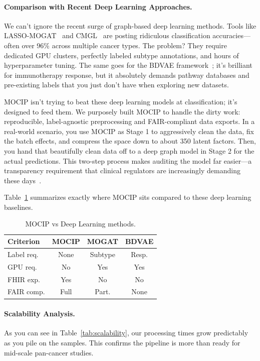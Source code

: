 \documentclass[conference,flushend]{iaria} %
\begin{document}
\paragraph{Comparison with Recent Deep Learning Approaches.}
We can't ignore the recent surge of graph-based deep learning methods. Tools like LASSO-MOGAT~\cite{alharbi2024lassomogat} and CMGL~\cite{fan2026cmgl} are posting ridiculous classification accuracies---often over 96\% across multiple cancer types. The problem? They require dedicated GPU clusters, perfectly labeled subtype annotations, and hours of hyperparameter tuning. The same goes for the BDVAE framework~\cite{tariq2025bdvae}; it's brilliant for immunotherapy response, but it absolutely demands pathway databases and pre-existing labels that you just don't have when exploring new datasets.

MOCIP isn't trying to beat these deep learning models at classification; it's designed to feed them. We purposely built MOCIP to handle the dirty work: reproducible, label-agnostic preprocessing and FAIR-compliant data exports. In a real-world scenario, you use MOCIP as Stage 1 to aggressively clean the data, fix the batch effects, and compress the space down to about 350 latent factors. Then, you hand that beautifully clean data off to a deep graph model in Stage 2 for the actual predictions. This two-step process makes auditing the model far easier---a transparency requirement that clinical regulators are increasingly demanding these days~\cite{muneer2025review}.

Table~\ref{tab:comparison_dl} summarizes exactly where MOCIP sits compared to these deep learning baselines.

\begin{table}[H]
\caption{MOCIP vs Deep Learning methods.}\label{tab:comparison_dl}
\centering
\scriptsize
\setlength{\tabcolsep}{2pt}
\begin{tabular}{l c c c}
\toprule
\textbf{Criterion} & \textbf{MOCIP} & \textbf{MOGAT} & \textbf{BDVAE} \\
\midrule
Label req.  & None  & Subtype & Resp. \\
GPU req.    & No    & Yes     & Yes \\
FHIR exp.   & Yes   & No      & No \\
FAIR comp.  & Full  & Part.   & None \\
\bottomrule
\end{tabular}
\end{table}

\paragraph{Scalability Analysis.}
As you can see in Table~\ref{tab:scalability}, our processing times grow predictably as you pile on the samples. This confirms the pipeline is more than ready for mid-scale pan-cancer studies.
\end{document}
